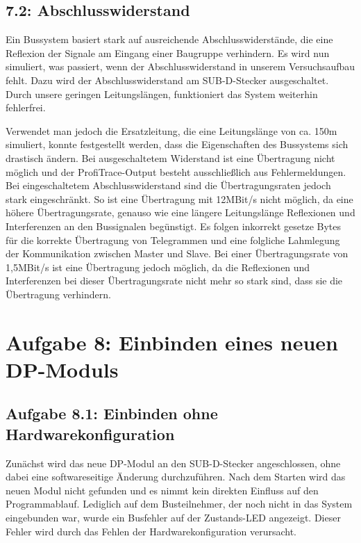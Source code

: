 \documentclass{report}
\begin{document}
\subsection{7.2: Abschlusswiderstand}

Ein Bussystem basiert stark auf ausreichende Abschlusswiderstände, die eine Reflexion der Signale am Eingang einer Baugruppe verhindern. Es wird nun simuliert, was passiert, wenn der Abschlusswiderstand in unserem Versuchsaufbau fehlt. Dazu wird der Abschlusswiderstand am SUB-D-Stecker ausgeschaltet. Durch unsere geringen Leitungslängen, funktioniert das System weiterhin fehlerfrei.

Verwendet man jedoch die Ersatzleitung, die eine Leitungslänge von ca. 150m simuliert, konnte festgestellt werden, dass die Eigenschaften des Bussystems sich drastisch ändern. Bei ausgeschaltetem Widerstand ist eine Übertragung nicht möglich und der ProfiTrace-Output besteht ausschließlich aus Fehlermeldungen. Bei eingeschaltetem Abschlusswiderstand sind die Übertragungsraten jedoch stark eingeschränkt. So ist eine Übertragung mit 12MBit/s nicht möglich, da eine höhere Übertragungsrate, genauso wie eine längere Leitungslänge Reflexionen und Interferenzen an den Bussignalen begünstigt. Es folgen inkorrekt gesetze Bytes für die korrekte Übertragung von Telegrammen und eine folgliche Lahmlegung der Kommunikation zwischen Master und Slave. Bei einer Übertragungsrate von 1,5MBit/s ist eine Übertragung jedoch möglich, da die Reflexionen und Interferenzen bei dieser Übertragungsrate nicht mehr so stark sind, dass sie die Übertragung verhindern.


\section{Aufgabe 8: Einbinden eines neuen DP-Moduls}

\subsection{Aufgabe 8.1: Einbinden ohne Hardwarekonfiguration}
Zunächst wird das neue DP-Modul an den SUB-D-Stecker angeschlossen, ohne dabei eine softwareseitige Änderung durchzuführen. Nach dem Starten wird das neuen Modul nicht gefunden und es nimmt kein direkten Einfluss auf den Programmablauf. Lediglich auf dem Busteilnehmer, der noch nicht in das System eingebunden war, wurde ein Busfehler auf der Zustands-LED angezeigt. Dieser Fehler wird durch das Fehlen der Hardwarekonfiguration verursacht.
\end{document}
